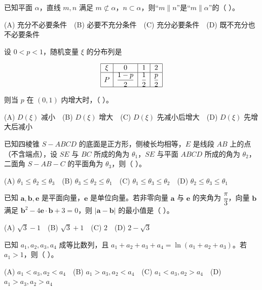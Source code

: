 \begin{question}
已知平面 $\alpha$，直线 $m, n$ 满足 $m \not\subset \alpha$，$n \subset \alpha$，则“$m \parallel n$”是“$m \parallel \alpha$”的（ ）。

(A) 充分不必要条件　(B) 必要不充分条件　(C) 充分必要条件　(D) 既不充分也不必要条件

\end{question}
\begin{question}
设 $0 < p < 1$，随机变量 $\xi$ 的分布列是

\nopagebreak[4]
\[\begin{array}{|c|c|c|c|}
\hline
\xi & 0 & 1 & 2 \\
\hline
P & \dfrac{1-p}{2} & \dfrac12 & \dfrac{p}{2} \\
\hline
\end{array}\]

则当 $p$ 在 $(0, 1)$ 内增大时，（ ）。

(A) $D(\xi)$ 减小　(B) $D(\xi)$ 增大　(C) $D(\xi)$ 先减小后增大　(D) $D(\xi)$ 先增大后减小

\end{question}
\begin{question}
已知四棱锥 $S - ABCD$ 的底面是正方形，侧棱长均相等，$E$ 是线段 $AB$ 上的点（不含端点），设 $SE$ 与 $BC$ 所成的角为 $\theta_1$，$SE$ 与平面 $ABCD$ 所成的角为 $\theta_2$，二面角 $S - AB - C$ 的平面角为 $\theta_3$，则（ ）。

(A) $\theta_1 \leqslant \theta_2 \leqslant \theta_3$　(B) $\theta_3 \leqslant \theta_2 \leqslant \theta_1$　(C) $\theta_1 \leqslant \theta_3 \leqslant \theta_2$　(D) $\theta_2 \leqslant \theta_3 \leqslant \theta_1$

\end{question}
\begin{question}
已知 $\boldsymbol a, \boldsymbol b, \boldsymbol e$ 是平面向量，$\boldsymbol e$ 是单位向量。若非零向量 $\boldsymbol a$ 与 $\boldsymbol e$ 的夹角为 $\dfrac{\pi}{3}$，向量 $\boldsymbol b$ 满足 $\boldsymbol b^2 - 4\boldsymbol e \cdot \boldsymbol b + 3 = 0$，则 $|\boldsymbol a - \boldsymbol b|$ 的最小值是（ ）。

(A) $\sqrt3 - 1$　(B) $\sqrt3 + 1$　(C) $2$　(D) $2 - \sqrt3$

\end{question}
\begin{question}
已知 $a_1, a_2, a_3, a_4$ 成等比数列，且 $a_1 + a_2 + a_3 + a_4 = \ln(a_1 + a_2 + a_3)$。若 $a_1 > 1$，则（ ）。

(A) $a_1 < a_3, a_2 < a_4$　(B) $a_1 > a_3, a_2 < a_4$　(C) $a_1 < a_3, a_2 > a_4$　(D) $a_1 > a_3, a_2 > a_4$

\par\medskip

\end{question}


